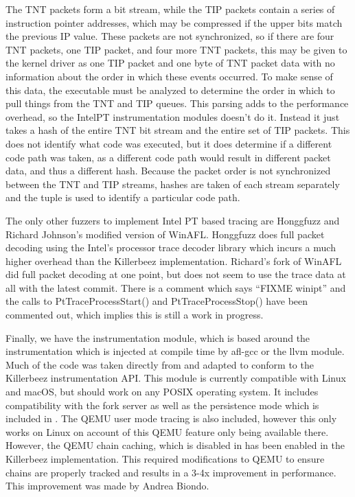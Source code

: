 The TNT packets form a bit stream, while the TIP packets contain a series of
instruction pointer addresses, which may be compressed if the upper bits match
the previous IP value. These packets are not synchronized, so if there are four
TNT packets, one TIP packet, and four more TNT packets, this may be given to
the kernel driver as one TIP packet and one byte of TNT packet data with no
information about the order in which these events occurred.  To make sense of
this data, the executable must be analyzed to determine the order in which to
pull things from the TNT and TIP queues. This parsing adds to the performance
overhead, so the IntelPT instrumentation modules doesn't do it. Instead it just
takes a hash of the entire TNT bit stream and the entire set of TIP packets.
This does not identify what code was executed, but it does determine if a
different code path was taken, as a different code path would result in
different packet data, and thus a different hash. Because the packet order is
not synchronized between the TNT and TIP streams, hashes are taken of each
stream separately and the tuple is used to identify a particular code path.

The only other fuzzers to implement Intel PT based tracing are
Honggfuzz\cite{honggfuzz} and Richard Johnson's modified version of
WinAFL\cite{winaflintelpt}. Honggfuzz does full packet decoding using the
Intel's processor trace decoder library\cite{libipt} which incurs a much
higher overhead than the Killerbeez implementation.  Richard's fork of WinAFL
did full packet decoding at one point, but does not seem to use the trace data
at all with the latest commit.\cite{winaflcommit} There is a comment which says
``FIXME winipt'' and the calls to PtTraceProcessStart() and
PtTraceProcessStop() have been commented out, which implies this is still a
work in progress.

Finally, we have the \AFL{} instrumentation module, which is based around the
instrumentation which is injected at compile time by afl-gcc or the \AFL{}
llvm module. Much of the code was taken directly from \AFL{} and adapted to
conform to the Killerbeez instrumentation API. This module is currently
compatible with Linux and macOS, but should work on any POSIX operating system.
It includes compatibility with the fork server as well as the persistence mode
which is included in \AFL{}.  The QEMU user mode tracing is also included,
however this only works on Linux on account of this QEMU feature only being
available there.  However, the QEMU chain caching, which is disabled in \AFL{}
has been enabled in the Killerbeez implementation. This required modifications
to QEMU to ensure chains are properly tracked and results in a 3-4x improvement
in performance. This improvement was made by Andrea Biondo.\cite{qemuspeedup}

